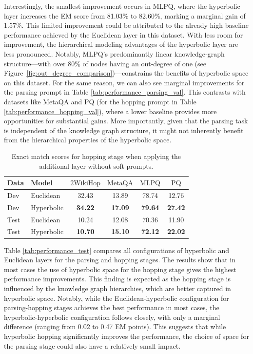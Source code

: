 \documentclass[11pt]{article}
\begin{document}
Interestingly, the smallest improvement occurs in MLPQ, where the hyperbolic layer increases the EM score from 81.03\% to 82.60\%, marking a marginal gain of 1.57\%. This limited improvement could be attributed to the already high baseline performance achieved by the Euclidean layer in this dataset. With less room for improvement, the hierarchical modeling advantages of the hyperbolic layer are less pronounced. Notably, MLPQ’s predominantly linear knowledge‐graph structure—with over 80\% of nodes having an out‐degree of one (see Figure~\ref{fig:out_degree_comparison})—constrains the benefits of hyperbolic space on this dataset. For the same reason, we can also see marginal improvements for the parsing prompt in Table \ref{tab:performance_parsing_val}.
This contrasts with datasets like MetaQA and PQ (for the hopping prompt in Table \ref{tab:performance_hopping_val}), where a lower baseline provides more opportunities for substantial gains. More importantly, given that the parsing task is independent of the knowledge graph structure, it might not inherently benefit from the hierarchical properties of the hyperbolic space.  

\begin{table}
\centering
\small
\setlength{\tabcolsep}{3.0pt}
\begin{tabularx}{\columnwidth}{Xlcccc}
\toprule
Data & Model & $\text{2WikiHop}$ & $\text{MetaQA}$ & $\text{MLPQ}$ & $\text{PQ}$\\ 
\midrule
Dev & Euclidean & 32.43 & 13.89 & 78.74 & 12.76 \\ 
Dev & Hyperbolic & \textbf{34.22} & \textbf{17.09} & \textbf{79.64} & \textbf{27.42} \\ 
\midrule
Test & Euclidean & 10.24 & 12.08 & 70.36 & 11.90 \\
Test & Hyperbolic & \textbf{10.70} & \textbf{15.10} & \textbf{72.12} & \textbf{22.02} \\
\bottomrule
\end{tabularx}
\caption{Exact match scores for hopping stage when applying the additional layer without soft prompts.}
\label{tab:validation_performance_no_soft_prompt}
\end{table}

Table \ref{tab:performance_test} compares all configurations of hyperbolic and Euclidean layers for the parsing and hopping stages. The results show that in most cases the use of hyperbolic space for the hopping stage gives the highest performance improvements. This finding is expected as the hopping stage is influenced by the knowledge graph hierarchies, which are better captured in hyperbolic space. Notably, while the Euclidean-hyperbolic configuration for parsing-hopping stages achieves the best performance in most cases, the hyperbolic-hyperbolic configuration follows closely, with only a marginal difference (ranging from 0.02 to 0.47 EM points). This suggests that while hyperbolic hopping significantly improves the performance, the choice of space for the parsing stage could also have a relatively small impact. 
\end{document}
